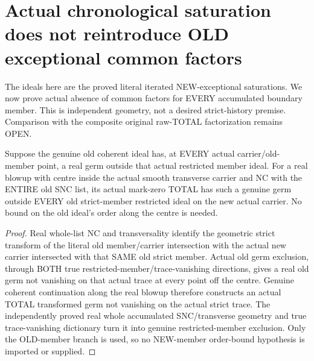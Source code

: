 \section{Actual chronological saturation does not reintroduce OLD exceptional common factors}

The ideals here are the proved literal iterated NEW-exceptional saturations.
We now prove actual absence of common factors for EVERY accumulated boundary
member. This is independent geometry, not a desired strict-history premise.
Comparison with the composite original raw-TOTAL factorization remains OPEN.

\begin{lemma}
\label{hir:sharp-actual-next-total-old-strict-member-no-factor}
\leanok
Suppose the genuine old coherent ideal has, at EVERY actual carrier/old-member
point, a real germ outside that actual restricted member ideal. For a real
blowup with centre inside the actual smooth transverse carrier and NC with
the ENTIRE old SNC list, its actual mark-zero TOTAL has such a genuine germ
outside EVERY old strict-member restricted ideal on the new actual carrier.
No bound on the old ideal's order along the centre is needed.
\end{lemma}
\begin{proof}
Real whole-list NC and transversality identify the geometric strict transform
of the literal old member/carrier intersection with the actual new carrier
intersected with that SAME old strict member. Actual old germ exclusion,
through BOTH true restricted-member/trace-vanishing directions, gives a real
old germ not vanishing on that actual trace at every point off the centre.
Genuine coherent continuation along the real blowup therefore constructs an
actual TOTAL transformed germ not vanishing on the actual strict trace.
The independently proved real whole accumulated SNC/transverse geometry and
true trace-vanishing dictionary turn it into genuine restricted-member
exclusion. Only the OLD-member branch is used, so no NEW-member order-bound
hypothesis is imported or supplied.
\end{proof}


